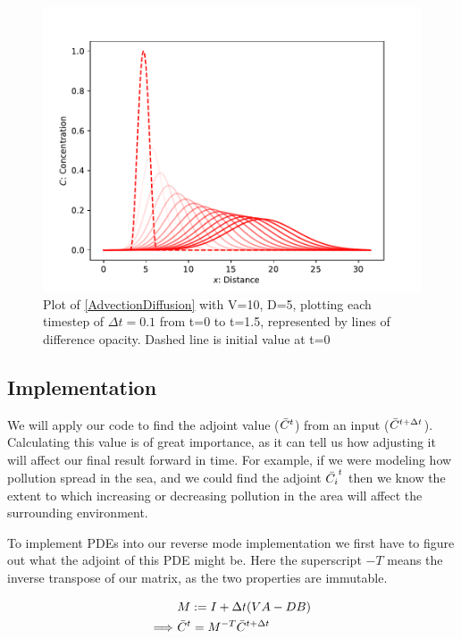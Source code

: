 \documentclass{article}
\begin{document}
\begin{figure}[h]
    \centering
    \includegraphics{images/Graph_PDE.pdf}
    \caption{Plot of \eqref{AdvectionDiffusion} with V=10, D=5, plotting each timestep of $\Delta t=0.1$ from t=0 to t=1.5, represented by lines of difference opacity. Dashed line is initial value at t=0}
    \label{fig:ODE}
\end{figure}

\subsection{Implementation}
We will apply our code to find the adjoint value ($\Bar{C}^t$) from an input ($\Bar{C}^{t+\Delta t}$). Calculating this value is of great importance, as it can tell us how adjusting it will affect our final result forward in time. For example, if we were modeling how pollution spread in the sea, and we could find the adjoint $\Bar{C_i}^t$ then we know the extent to which increasing or decreasing pollution in the area will affect the surrounding environment.

To implement PDEs into our reverse mode implementation we first have to figure out what the adjoint of this PDE might be. Here the superscript $-T$ means the inverse transpose of our matrix, as the two properties are immutable.

\begin{equation} \label{PDEadjoint}
    \begin{split}
        & M := I + \Delta t(VA - DB) \\
        \Longrightarrow \ &  \Bar{C}^{t} = M^{-T} \Bar{C}^{t+\Delta t}
    \end{split}
\end{equation}
\end{document}
